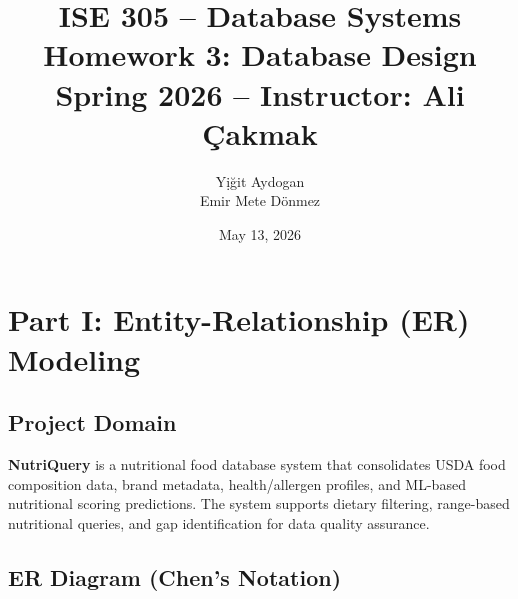 \documentclass[12pt,a4paper]{article}
\title{\textbf{ISE 305 -- Database Systems}\\Homework 3: Database Design\\[6pt]\large Spring 2026 -- Instructor: Ali \c{C}akmak}
\author{Y\d{i}\u{g}it Aydogan \quad 150230208\\Emir Mete D\"{o}nmez \quad 150220205}
\date{May 13, 2026}
\begin{document}
\maketitle
\tableofcontents
\newpage

\section{Part I: Entity-Relationship (ER) Modeling}

\subsection{Project Domain}
\textbf{NutriQuery} is a nutritional food database system that consolidates USDA 
food composition data, brand metadata, health/allergen profiles, and ML-based nutritional 
scoring predictions. The system supports dietary filtering, range-based nutritional queries, 
and gap identification for data quality assurance.

\subsection{ER Diagram (Chen's Notation)}
\end{document}
